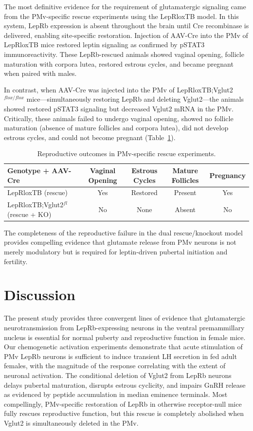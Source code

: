 \documentclass[12pt]{article}
\begin{document}
The most definitive evidence for the requirement of glutamatergic signaling came from the PMv-specific rescue experiments using the LepRloxTB model. In this system, LepRb expression is absent throughout the brain until Cre recombinase is delivered, enabling site-specific restoration. Injection of AAV-Cre into the PMv of LepRloxTB mice restored leptin signaling as confirmed by pSTAT3 immunoreactivity. These LepRb-rescued animals showed vaginal opening, follicle maturation with corpora lutea, restored estrous cycles, and became pregnant when paired with males.

In contrast, when AAV-Cre was injected into the PMv of LepRloxTB;Vglut2$^{flox/flox}$ mice---simultaneously restoring LepRb and deleting Vglut2---the animals showed restored pSTAT3 signaling but decreased Vglut2 mRNA in the PMv. Critically, these animals failed to undergo vaginal opening, showed no follicle maturation (absence of mature follicles and corpora lutea), did not develop estrous cycles, and could not become pregnant (Table~\ref{tab:rescue}).

\begin{table}[htbp]
\centering
\caption{Reproductive outcomes in PMv-specific rescue experiments.}
\label{tab:rescue}
\begin{tabular}{lcccc}
\toprule
Genotype + AAV-Cre & Vaginal Opening & Estrous Cycles & Mature Follicles & Pregnancy \\
\midrule
LepRloxTB (rescue) & Yes & Restored & Present & Yes \\
LepRloxTB;Vglut2$^{fl}$ (rescue + KO) & No & None & Absent & No \\
\bottomrule
\end{tabular}
\end{table}

The completeness of the reproductive failure in the dual rescue/knockout model provides compelling evidence that glutamate release from PMv neurons is not merely modulatory but is required for leptin-driven pubertal initiation and fertility.

\section{Discussion}

The present study provides three convergent lines of evidence that glutamatergic neurotransmission from LepRb-expressing neurons in the ventral premammillary nucleus is essential for normal puberty and reproductive function in female mice. Our chemogenetic activation experiments demonstrate that acute stimulation of PMv LepRb neurons is sufficient to induce transient LH secretion in fed adult females, with the magnitude of the response correlating with the extent of neuronal activation. The conditional deletion of Vglut2 from LepRb neurons delays pubertal maturation, disrupts estrous cyclicity, and impairs GnRH release as evidenced by peptide accumulation in median eminence terminals. Most compellingly, PMv-specific restoration of LepRb in otherwise receptor-null mice fully rescues reproductive function, but this rescue is completely abolished when Vglut2 is simultaneously deleted in the PMv.
\end{document}
